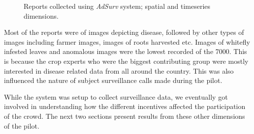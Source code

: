 \documentclass[letterpaper]{article} %
\begin{document}
\begin{figure}[!h]
\centering
{}
\caption{Reports collected using \emph{AdSurv} system; spatial and timeseries dimensions.}
\label{reports}
\end{figure}







Most of the reports were of images depicting disease, followed by other types of images including farmer images, images of roots harvested etc. Images of whitefly infested leaves and anomalous images were the lowest recorded of the 7000. This is because the crop experts who were the biggest contributing group were mostly interested in disease related data from all around the country. This was also influenced the nature of subject surveillance calls made during the pilot.

While the system was setup to collect surveillance data, we eventually got involved in understanding how the different incentives affected the participation of the crowd. The next two sections present results from these other dimensions of the pilot.
\end{document}

